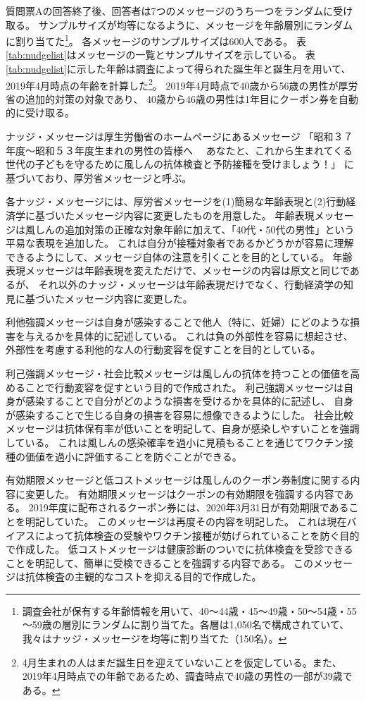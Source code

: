 \documentclass[
  11pt,
  a4paper,
]{article}
\begin{document}
質問票Aの回答終了後、回答者は7つのメッセージのうち一つをランダムに受け取る。
サンプルサイズが均等になるように、メッセージを年齢層別にランダムに割り当てた\footnote{調査会社が保有する年齢情報を用いて、40～44歳・45～49歳・50～54歳・55～59歳の層別にランダムに割り当てた。各層は1,050名で構成されていて、我々はナッジ・メッセージを均等に割り当てた（150名）。}。
各メッセージのサンプルサイズは600人である。
表\ref{tab:nudgelist}はメッセージの一覧とサンプルサイズを示している。
表\ref{tab:nudgelist}に示した年齢は調査によって得られた誕生年と誕生月を用いて、2019年4月時点の年齢を計算した\footnote{4月生まれの人はまだ誕生日を迎えていないことを仮定している。また、2019年4月時点での年齢であるため、調査時点で40歳の男性の一部が39歳である。}。
2019年4月時点で40歳から56歳の男性が厚労省の追加的対策の対象であり、
40歳から46歳の男性は1年目にクーポン券を自動的に受け取る。

ナッジ・メッセージは厚生労働省のホームページにあるメッセージ
「昭和３７年度～昭和５３年度生まれの男性の皆様へ　
あなたと、これから生まれてくる世代の子どもを守るために風しんの抗体検査と予防接種を受けましょう！」
に基づいており、厚労省メッセージと呼ぶ。

各ナッジ・メッセージには、厚労省メッセージを(1)簡易な年齢表現と(2)行動経済学に基づいたメッセージ内容に変更したものを用意した。
年齢表現メッセージは風しんの追加対策の正確な対象年齢に加えて、「40代・50代の男性」という平易な表現を追加した。
これは自分が接種対象者であるかどうかが容易に理解できるようにして、メッセージ自体の注意を引くことを目的としている。
年齢表現メッセージは年齢表現を変えただけで、メッセージの内容は原文と同じであるが、
それ以外のナッジ・メッセージは年齢表現だけでなく、行動経済学の知見に基づいたメッセージ内容に変更した。

利他強調メッセージは自身が感染することで他人（特に、妊婦）にどのような損害を与えるかを具体的に記述している。
これは負の外部性を容易に想起させ、外部性を考慮する利他的な人の行動変容を促すことを目的としている。

利己強調メッセージ・社会比較メッセージは風しんの抗体を持つことの価値を高めることで行動変容を促すという目的で作成された。
利己強調メッセージは自身が感染することで自分がどのような損害を受けるかを具体的に記述し、
自身が感染することで生じる自身の損害を容易に想像できるようにした。
社会比較メッセージは抗体保有率が低いことを明記して、自身が感染しやすいことを強調している。
これは風しんの感染確率を過小に見積もることを通じてワクチン接種の価値を過小に評価することを防ぐことができる。

有効期限メッセージと低コストメッセージは風しんのクーポン券制度に関する内容に変更した。
有効期限メッセージはクーポンの有効期限を強調する内容である。
2019年度に配布されるクーポン券には、2020年3月31日が有効期限であることを明記していた。
このメッセージは再度その内容を明記した。
これは現在バイアスによって抗体検査の受験やワクチン接種が妨げられていることを防ぐ目的で作成した。
低コストメッセージは健康診断のついでに抗体検査を受診できることを明記して、簡単に受検できることを強調する内容である。
このメッセージは抗体検査の主観的なコストを抑える目的で作成した。
\end{document}
